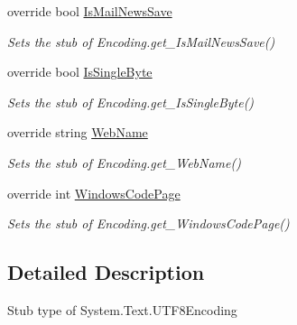 \begin{DoxyCompactItemize}
override bool \hyperlink{class_system_1_1_text_1_1_fakes_1_1_stub_u_t_f8_encoding_a5d1a7fa67101e099d8c3140e8d673312}{Is\-Mail\-News\-Save}
\begin{DoxyCompactList}\small\item\em Sets the stub of Encoding.\-get\-\_\-\-Is\-Mail\-News\-Save()\end{DoxyCompactList}\item 
override bool \hyperlink{class_system_1_1_text_1_1_fakes_1_1_stub_u_t_f8_encoding_ab8144701503360a19f03fef34ae25554}{Is\-Single\-Byte}
\begin{DoxyCompactList}\small\item\em Sets the stub of Encoding.\-get\-\_\-\-Is\-Single\-Byte()\end{DoxyCompactList}\item 
override string \hyperlink{class_system_1_1_text_1_1_fakes_1_1_stub_u_t_f8_encoding_a6f8c4a50757942bc8a5ae63444a4a392}{Web\-Name}
\begin{DoxyCompactList}\small\item\em Sets the stub of Encoding.\-get\-\_\-\-Web\-Name()\end{DoxyCompactList}\item 
override int \hyperlink{class_system_1_1_text_1_1_fakes_1_1_stub_u_t_f8_encoding_a07e987ad911f8419bc3981336c20fab9}{Windows\-Code\-Page}
\begin{DoxyCompactList}\small\item\em Sets the stub of Encoding.\-get\-\_\-\-Windows\-Code\-Page()\end{DoxyCompactList}\end{DoxyCompactItemize}


\subsection{Detailed Description}
Stub type of System.\-Text.\-U\-T\-F8\-Encoding



